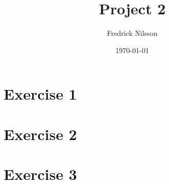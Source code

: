 \documentclass[12pt]{article}
\title{Project 2}
\author{Fredrick Nilsson}
\date{\today}
\begin{document}
\maketitle

\tableofcontents

\newpage

\section*{Exercise 1}

\newpage

\section*{Exercise 2}

\newpage

\section*{Exercise 3}
\end{document}
